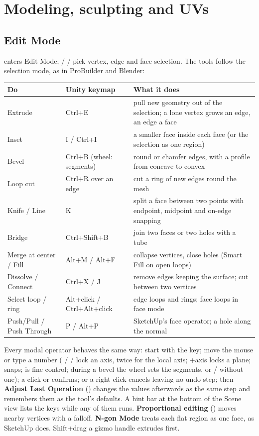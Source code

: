 \chapter{Modeling, sculpting and UVs}
\label{ch:model}

\section{Edit Mode}
 enters Edit Mode;  /  /  pick vertex, edge and face selection. The tools follow the
selection mode, as in ProBuilder and Blender:

\begin{center}
\begin{tabularx}{\textwidth}{llX}
\toprule
Do & Unity keymap & What it does \\
\midrule
Extrude & Ctrl+E & pull new geometry out of the selection; a lone vertex grows an edge, an edge a face \\
Inset & I / Ctrl+I & a smaller face inside each face (or the selection as one region) \\
Bevel & Ctrl+B (wheel: segments) & round or chamfer edges, with a profile from concave to convex \\
Loop cut & Ctrl+R over an edge & cut a ring of new edges round the mesh \\
Knife / Line & K & split a face between two points with endpoint, midpoint and on-edge snapping \\
Bridge & Ctrl+Shift+B & join two faces or two holes with a tube \\
Merge at center / Fill & Alt+M / Alt+F & collapse vertices, close holes (Smart Fill on open loops) \\
Dissolve / Connect & Ctrl+X / J & remove edges keeping the surface; cut between two vertices \\
Select loop / ring & Alt+click / Ctrl+Alt+click & edge loops and rings; face loops in face mode \\
Push/Pull / Push Through & P / Alt+P & SketchUp's face operator; a hole along the normal \\
\bottomrule
\end{tabularx}
\end{center}

Every modal operator behaves the same way: start with the key; move the mouse or type a number ( /  /
 lock an axis, twice for the local axis; +axis locks a plane;  snaps;  is fine
control; during a bevel the wheel sets the segments, or \key{]} / \key{[} without one); a click or  confirms;
 or a right-click cancels leaving no undo step; then \textbf{Adjust Last Operation} () changes the
values afterwards as the same step and remembers them as the tool's defaults. A hint bar at the bottom of the Scene
view lists the keys while any of them runs. \textbf{Proportional editing} () moves nearby vertices with a falloff.
\textbf{N-gon Mode} treats each flat region as one face, as SketchUp does. Shift+drag a gizmo handle extrudes first.

